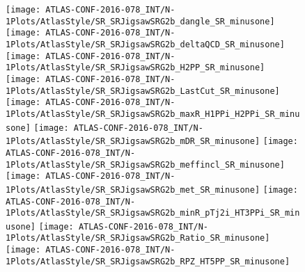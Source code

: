 \begin{figure}[tbph]
\begin{center}
\end{center}
\caption{}
\label{fig:SR_SRJigsawSRG2a_meffincl_SR_minusone}
\end{figure}

\begin{figure}[tbph]
\begin{center}
\texttt{[image: ATLAS-CONF-2016-078\_INT/N-1Plots/AtlasStyle/SR\_SRJigsawSRG2b\_dangle\_SR\_minusone]}
\texttt{[image: ATLAS-CONF-2016-078\_INT/N-1Plots/AtlasStyle/SR\_SRJigsawSRG2b\_deltaQCD\_SR\_minusone]}
\texttt{[image: ATLAS-CONF-2016-078\_INT/N-1Plots/AtlasStyle/SR\_SRJigsawSRG2b\_H2PP\_SR\_minusone]}
\texttt{[image: ATLAS-CONF-2016-078\_INT/N-1Plots/AtlasStyle/SR\_SRJigsawSRG2b\_LastCut\_SR\_minusone]}
\texttt{[image: ATLAS-CONF-2016-078\_INT/N-1Plots/AtlasStyle/SR\_SRJigsawSRG2b\_maxR\_H1PPi\_H2PPi\_SR\_minusone]}
\texttt{[image: ATLAS-CONF-2016-078\_INT/N-1Plots/AtlasStyle/SR\_SRJigsawSRG2b\_mDR\_SR\_minusone]}
\texttt{[image: ATLAS-CONF-2016-078\_INT/N-1Plots/AtlasStyle/SR\_SRJigsawSRG2b\_meffincl\_SR\_minusone]}
\texttt{[image: ATLAS-CONF-2016-078\_INT/N-1Plots/AtlasStyle/SR\_SRJigsawSRG2b\_met\_SR\_minusone]}
\texttt{[image: ATLAS-CONF-2016-078\_INT/N-1Plots/AtlasStyle/SR\_SRJigsawSRG2b\_minR\_pTj2i\_HT3PPi\_SR\_minusone]}
\texttt{[image: ATLAS-CONF-2016-078\_INT/N-1Plots/AtlasStyle/SR\_SRJigsawSRG2b\_Ratio\_SR\_minusone]}
\texttt{[image: ATLAS-CONF-2016-078\_INT/N-1Plots/AtlasStyle/SR\_SRJigsawSRG2b\_RPZ\_HT5PP\_SR\_minusone]}
\end{center}
\caption{}
\label{fig:SR_SRJigsawSRG2b_deltaQCD_SR_minusone}
\end{figure}

